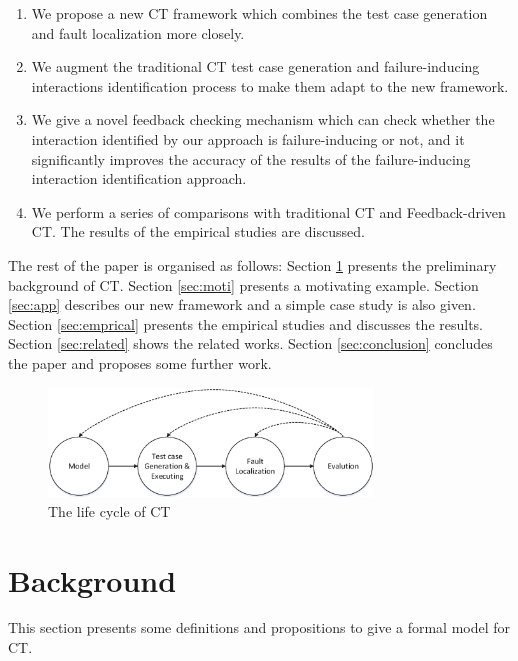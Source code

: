 \documentclass[journal,12pt,onecolumn,draftclsnofoot,]{IEEEtran}
\begin{document}
 \begin{enumerate}
 \item  We propose a new CT framework which combines the test case generation and fault localization more closely.
 \item  We augment the traditional CT test case generation and failure-inducing interactions identification process to make them adapt to the new framework.
 \item  We give a novel feedback checking mechanism which can check whether the interaction identified by our approach is failure-inducing or not, and it significantly improves the accuracy of the results of the failure-inducing interaction identification approach.
 \item We perform a series of comparisons with traditional CT and Feedback-driven CT. The results of the empirical studies are discussed.
\end{enumerate}


The rest of the paper is organised as follows: Section \ref{sec:back} presents the preliminary background of CT. Section \ref{sec:moti} presents a motivating example. Section \ref{sec:app} describes our new framework and a simple case study is also given. Section \ref{sec:emprical} presents the empirical studies and discusses the results. Section \ref{sec:related} shows the related works. Section \ref{sec:conclusion} concludes the paper and proposes some further work.


\begin{figure}
 \includegraphics[width=3.4in]{CT_lifecircle.eps}
\caption{The life cycle of CT}
\label{ct-life}
\end{figure}





\section{Background}\label{sec:back}
This section presents some definitions and propositions to give a formal model for CT.
\end{document}
